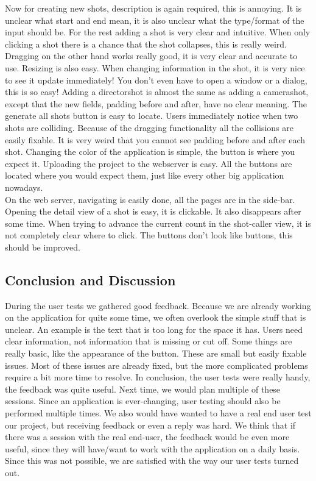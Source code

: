 Now for creating new shots, description is again required, this is annoying. It is unclear what start and end mean, it is also unclear what the type/format of the input should be. For the rest adding a shot is very clear and intuitive. When only clicking a shot there is a chance that the shot collapses, this is really weird. Dragging on the other hand works really good, it is very clear and accurate to use. Resizing is also easy. When changing information in the shot, it is very nice to see it update immediately! You don't even have to open a window or a dialog, this is so easy! Adding a directorshot is almost the same as adding a camerashot, except that the new fields, padding before and after, have no clear meaning. The generate all shots button is easy to locate. Users immediately notice when two shots are colliding. Because of the dragging functionality all the collisions are easily fixable. It is very weird that you cannot see padding before and after each shot. Changing the color of the application is simple, the button is where you expect it. Uploading the project to the webserver is  easy. All the buttons are located where you would expect them, just like every other big application nowadays.\\

On the web server, navigating is easily done, all the pages are in the side-bar. Opening the detail view of a shot is easy, it is clickable. It also disappears after some time. When trying to advance the current count in the shot-caller view, it is not completely clear where to click. The buttons don't look like buttons, this should be improved.
\subsection{Conclusion and Discussion}
During the user tests we gathered good feedback. Because we are already working on the application for quite some time, we often overlook the simple stuff that is unclear. An example is the text that is too long for the space it has. Users need clear information, not information that is missing or cut off. Some things are really basic, like the appearance of the button. These are small but easily fixable issues. Most of these issues are already fixed, but the more complicated problems require a bit more time to resolve. In conclusion, the user tests were really handy, the feedback was quite useful. Next time, we would plan multiple of these sessions. Since an application is ever-changing, user testing should also be performed multiple times. We also would have wanted to have a real end user test our project, but receiving feedback or even a reply was hard. We think that if there was a session with the real end-user, the feedback would be even more useful, since they will have/want to work with the application on a daily basis. Since this was not possible, we are satisfied with the way our user tests turned out.
